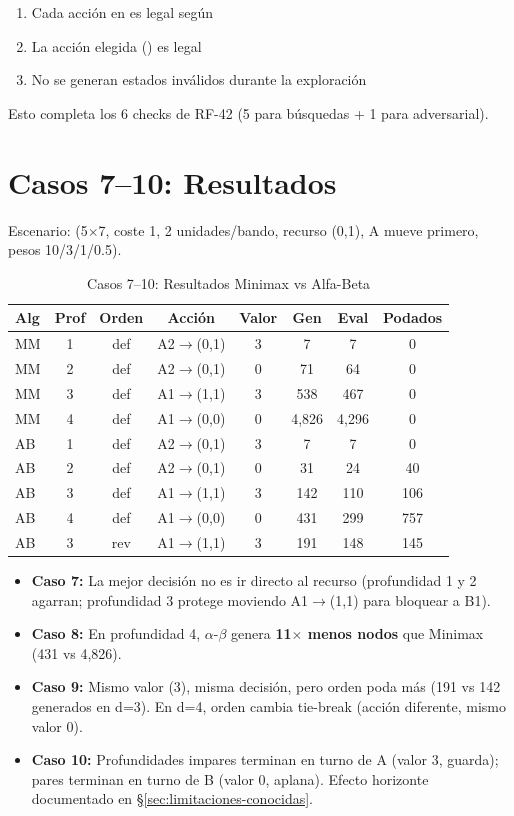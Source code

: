 \begin{enumerate}
\item Cada acción en  es legal según 
\item La acción elegida () es legal
\item No se generan estados inválidos durante la exploración
\end{enumerate}

Esto completa los 6 checks de RF-42 (5 para búsquedas + 1 para adversarial).

\section{Casos 7--10: Resultados}
\label{sec:casos7-10}

Escenario:  (5$\times$7, coste 1, 2 unidades/bando,
recurso (0,1), A mueve primero, pesos 10/3/1/0.5).

\begin{table}[H]
\centering
\caption{Casos 7--10: Resultados Minimax vs Alfa-Beta}
\begin{tabular}{lccccccc}
\toprule
Alg & Prof & Orden & Acción & Valor & Gen & Eval & Podados \\
\midrule
MM & 1 & def & A2$\to$(0,1) & 3 & 7 & 7 & 0 \\
MM & 2 & def & A2$\to$(0,1) & 0 & 71 & 64 & 0 \\
MM & 3 & def & A1$\to$(1,1) & 3 & 538 & 467 & 0 \\
MM & 4 & def & A1$\to$(0,0) & 0 & 4,826 & 4,296 & 0 \\
AB & 1 & def & A2$\to$(0,1) & 3 & 7 & 7 & 0 \\
AB & 2 & def & A2$\to$(0,1) & 0 & 31 & 24 & 40 \\
AB & 3 & def & A1$\to$(1,1) & 3 & 142 & 110 & 106 \\
AB & 4 & def & A1$\to$(0,0) & 0 & 431 & 299 & 757 \\
AB & 3 & rev & A1$\to$(1,1) & 3 & 191 & 148 & 145 \\
\bottomrule
\end{tabular}
\end{table}
\label{tab:casos7-10}


\begin{itemize}
\item \textbf{Caso 7:} La mejor decisión no es ir directo al recurso (profundidad 1 y 2 agarran;
  profundidad 3 protege moviendo A1$\to$(1,1) para bloquear a B1).
\item \textbf{Caso 8:} En profundidad 4, $\alpha$-$\beta$ genera \textbf{11$\times$ menos nodos}
  que Minimax (431 vs 4,826).
\item \textbf{Caso 9:} Mismo valor (3), misma decisión, pero orden  poda más
  (191 vs 142 generados en d=3). En d=4, orden  cambia tie-break (acción
  diferente, mismo valor 0).
\item \textbf{Caso 10:} Profundidades impares terminan en turno de A (valor 3, guarda);
  pares terminan en turno de B (valor 0, aplana). Efecto horizonte documentado en \S\ref{sec:limitaciones-conocidas}.
\end{itemize}